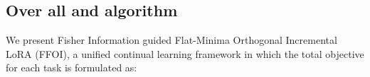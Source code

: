\documentclass[letterpaper]{article} %
\begin{document}


















\subsection{Over all and algorithm}

We present Fisher Information guided Flat-Minima Orthogonal Incremental LoRA (FFOI), a unified continual learning framework in which the total objective for each task is formulated as:
\end{document}
